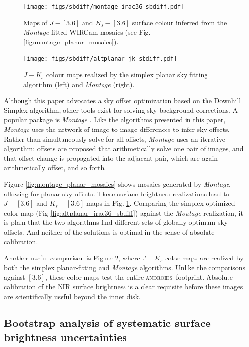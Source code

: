 \documentclass[iop]{emulateapj}
\newcommand{\sw}[1]{\textit{#1}} %
\newcommand{\androids}{\textsc{androids}}
\begin{document}
\begin{figure}[t]
    \centering
        \texttt{[image: figs/sbdiff/montage\_irac36\_sbdiff.pdf]}
    \caption{Maps of $J-[3.6]$ and $K_s-[3.6]$ surface colour inferred from the \sw{Montage}-fitted WIRCam mosaics (see Fig. \ref{fig:montage_planar_mosaics}).}
    \label{fig:montage_irac36_sbdiff}
\end{figure}

\begin{figure}[t]
    \centering
        \texttt{[image: figs/sbdiff/altplanar\_jk\_sbdiff.pdf]}
    \caption{$J-K_s$ colour maps realized by the simplex planar sky fitting algorithm (left) and \sw{Montage} (right).}
    \label{fig:altplanar_jk_sbdiff}
\end{figure}


Although this paper advocates a sky offset optimization based on the \cite{Nelder:1965} Downhill Simplex algorithm, other tools exist for solving sky background corrections. A popular package is \sw{Montage} \citep{Berriman:2008}. Like the algorithms presented in this paper, \sw{Montage} uses the network of image-to-image differences to infer sky offsets. Rather than simultaneously solve for all offsets, \sw{Montage} uses an iterative algorithm: offsets are proposed that arithmetically solve one pair of images, and that offset change is propagated into the adjacent pair, which are again arithmetically offset, and so forth.

Figure \ref{fig:montage_planar_mosaics} shows mosaics generated by \sw{Montage}, allowing for planar sky offsets. These surface brightness realizations lead to $J-[3.6]$ and $K_s-[3.6]$ maps in Fig. \ref{fig:montage_irac36_sbdiff}. Comparing the simplex-optimized color map (Fig \ref{fig:altplanar_irac36_sbdiff}) against the \sw{Montage} realization, it is plain that the two algorithms find different sets of globally optimum sky offsets. And neither of the solutions is optimal in the sense of absolute calibration.

Another useful comparison is Figure \ref{fig:altplanar_jk_sbdiff}, where $J-K_s$ color maps are realized by both the simplex planar-fitting and \sw{Montage} algorithms. Unlike the comparisons against $[3.6]$, these color maps test the entire \androids\ footprint. Absolute calibration of the NIR surface brightness is a clear requisite before these images are scientifically useful beyond the inner disk.

\subsection{Bootstrap analysis of systematic surface brightness uncertainties}
\end{document}
